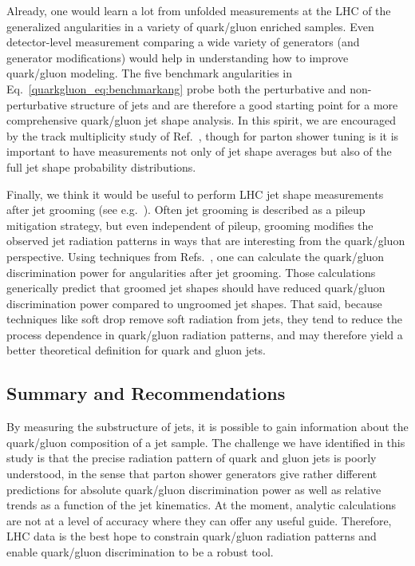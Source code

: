 \documentclass[11pt]{cernrep}
\begin{document}
Already, one would learn a lot from unfolded measurements at the LHC  of the generalized angularities in a variety of quark/gluon enriched samples.  Even detector-level measurement comparing a wide variety of generators (and generator modifications) would help in understanding how to improve quark/gluon modeling.   The five benchmark angularities in Eq.~\eqref{quarkgluon_eq:benchmarkang} probe both the perturbative and non-perturbative structure of jets and are therefore a good starting point for a more comprehensive quark/gluon jet shape analysis.  In this spirit, we are encouraged by the track multiplicity study of Ref.~\cite{Aad:2016oit}, though for parton shower tuning is it is important to have measurements not only of jet shape averages but also of the full jet shape probability distributions.

Finally, we think it would be useful to perform LHC jet shape measurements after jet grooming (see e.g.~\cite{Butterworth:2008iy,Ellis:2009su,Ellis:2009me,Krohn:2009th}).  Often jet grooming is described as a pileup mitigation strategy, but even independent of pileup, grooming modifies the observed jet radiation patterns in ways that are interesting from the quark/gluon perspective.  Using techniques from Refs.~\cite{Dasgupta:2013ihk,Larkoski:2014wba}, one can calculate the quark/gluon discrimination power for angularities after jet grooming.  Those calculations generically predict that groomed jet shapes should have reduced quark/gluon discrimination power compared to ungroomed jet shapes.  That said, because techniques like soft drop \cite{Larkoski:2014wba} remove soft radiation from jets, they tend to reduce the process dependence in quark/gluon radiation patterns, and may therefore yield a better theoretical definition for quark and gluon jets.

\subsection{Summary and Recommendations}
\label{quarkgluon_sec:conclude}

By measuring the substructure of jets, it is possible to gain information about the quark/gluon composition of a jet sample.  The challenge we have identified in this study is that the precise radiation pattern of quark and gluon jets is poorly understood, in the sense that parton shower generators give rather different predictions for absolute quark/gluon discrimination power as well as relative trends as a function of the jet kinematics.  At the moment, analytic calculations are not at a level of accuracy where they can offer any useful guide.  Therefore, LHC data is the best hope to constrain quark/gluon radiation patterns and enable quark/gluon discrimination to be a robust tool.
\end{document}
